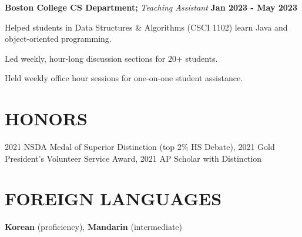 \documentclass[11pt]{article}
\begin{document}
\raggedright
\textbf{Boston College CS Department;} \textit{Teaching Assistant} \hfill \textbf{Jan 2023 - May 2023}
\begin{sublist}
	\item Helped students in Data Structures \& Algorithms (CSCI 1102) learn Java and object-oriented programming. 
	\item Led weekly, hour-long discussion sections for 20+ students. 
	\item Held weekly office hour sessions for one-on-one student assistance.
\end{sublist}

\section*{HONORS}
2021 NSDA Medal of Superior Distinction (top 2\% HS Debate), 2021 Gold President’s Volunteer Service Award, 2021 AP Scholar with Distinction

\section*{FOREIGN LANGUAGES}
\textbf{Korean} (proficiency), \textbf{Mandarin} (intermediate)
\end{document}
